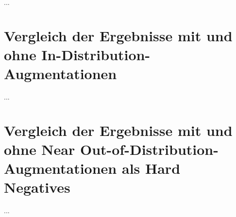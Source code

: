 ...

\section{Vergleich der Ergebnisse mit und ohne In-Distribution-Augmentationen}

...

\section{Vergleich der Ergebnisse mit und ohne Near Out-of-Distribution-Augmentationen als Hard Negatives}

...
